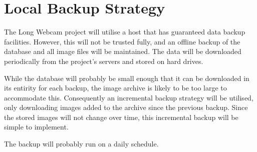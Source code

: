 \documentclass[11pt]{article}
\begin{document}
\section{Local Backup Strategy}
\label{sec:backup}
The Long Webcam project will utilise a host that has guaranteed data backup facilities. However, this will not be trusted fully, and an offline backup of the database and all image files will be maintained. The data will be downloaded periodically from the project's servers and stored on hard drives.

While the database will probably be small enough that it can be downloaded in its entirity for each backup, the image archive is likely to be too large to accommodate this. Consequently an incremental backup strategy will be utilised, only downloading images added to the archive since the previous backup. Since the stored images will not change over time, this incremental backup will be simple to implement.

The backup will probably run on a daily schedule.
\end{document}
